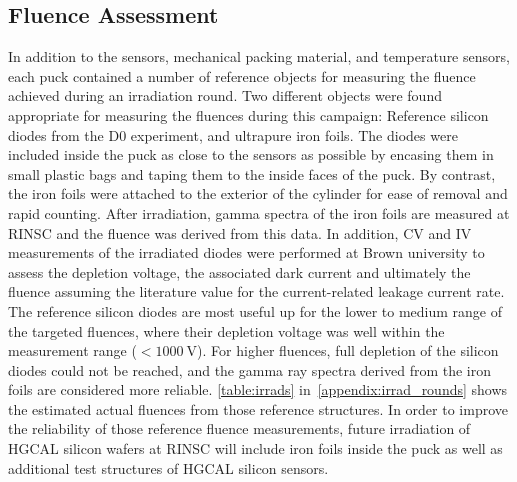 \subsection{Fluence Assessment}
In addition to the sensors, mechanical packing material, and temperature sensors, each puck contained a number of reference objects for measuring the fluence achieved during an irradiation round. 
Two different objects were found appropriate for measuring the fluences during this campaign: Reference silicon diodes from the D0 experiment, and ultrapure iron foils. 
The diodes were included inside the puck as close to the sensors as possible by encasing them in small plastic bags and taping them to the inside faces of the puck. 
By contrast, the iron foils were attached to the exterior of the cylinder for ease of removal and rapid counting. \newline
After irradiation, gamma spectra of the iron foils are measured at RINSC and the fluence was derived from this data.
In addition, CV and IV measurements of the irradiated diodes were performed at Brown university to assess the depletion voltage, the associated dark current and ultimately the fluence assuming the literature value for the current-related leakage current rate.\newline
The reference silicon diodes are most useful up for the lower to medium range of the targeted fluences,  where their depletion voltage was well within the measurement range ($<\SI{1000}{\volt}$).
For higher fluences, full depletion of the silicon diodes could not be reached, and the gamma ray spectra derived from the iron foils are considered more reliable.
\ref{table:irrads} in~\ref{appendix:irrad_rounds} shows the estimated actual fluences from those reference structures.\newline
In order to improve the reliability of those reference fluence measurements, future irradiation of HGCAL silicon wafers at RINSC will include iron foils inside the puck as well as additional test structures of HGCAL silicon sensors.